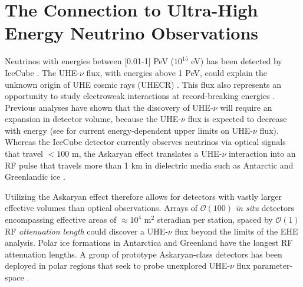 \documentclass[11pt]{amsart}
\begin{document}
\section{The Connection to Ultra-High Energy Neutrino Observations}
\label{sec:askaryan}

Neutrinos with energies between [0.01-1] PeV ($10^{15}$ eV) has been detected by IceCube \cite{10.1126/science.1242856,10.1126/science.aat2890,10.1126/science.abg3395,10.1126/science.adc9818}.  The UHE-$\nu$ flux, with energies above 1 PeV, could explain the unknown origin of UHE cosmic rays (UHECR) \cite{Ackermann:201946d}.  This flux also represents an opportunity to study electroweak interactions at record-breaking energies \cite{Ackermann:20195ec}.  Previous analyses have shown that the discovery of UHE-$\nu$ will require an expansion in detector volume, because the UHE-$\nu$ flux is expected to decrease with energy (see \cite{10.1103/physrevd.99.122001,10.1088/1475-7516/2020/03/053,10.1103/physrevd.98.062003} for current energy-dependent upper limits on UHE-$\nu$ flux).  Whereas the IceCube detector currently observes neutrinos via optical signals that travel $<100$ m, the Askaryan effect translates a UHE-$\nu$ interaction into an RF pulse that travels more than 1 km in dielectric media such as Antarctic and Greenlandic ice \cite{askaryan1,zhs,10.3189/2015jog14j214, 10.3189/2015jog15j057, 10.1016/j.astropartphys.2011.11.010}. 

Utilizing the Askaryan effect therefore allows for detectors with vastly larger effective volumes than optical observations.  Arrays of $\mathcal{O}(100)$ \textit{in situ} detectors encompassing effective areas of $\approx 10^4$ m$^2$ steradian per station, spaced by $\mathcal{O}(1)$ RF \textit{attenuation length} could discover a UHE-$\nu$ flux beyond the limits of the EHE analysis.  Polar ice formations in Antarctica and Greenland have the longest RF attenuation lengths.  A group of prototype Askaryan-class detectors has been deployed in polar regions that seek to probe unexplored UHE-$\nu$ flux parameter-space \cite{rice,10.1088/1475-7516/2020/03/053,10.1103/physrevd.102.043021,10.1103/physrevd.99.122001}. 
\end{document}
